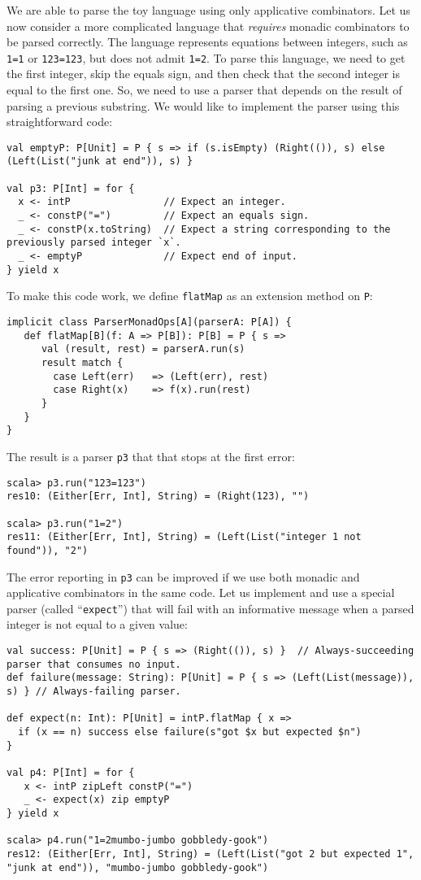 We are able to parse the toy language using only applicative combinators.
Let us now consider a more complicated language that \emph{requires}
monadic combinators to be parsed correctly. The language represents
equations between integers, such as \lstinline!1=1! or \lstinline!123=123!,
but does not admit \lstinline!1=2!. To parse this language, we need
to get the first integer, skip the equals sign, and then check that
the second integer is equal to the first one. So, we need to use a
parser that depends on the result of parsing a previous substring.
We would like to implement the parser using this straightforward code:
\begin{lstlisting}
val emptyP: P[Unit] = P { s => if (s.isEmpty) (Right(()), s) else (Left(List("junk at end")), s) }

val p3: P[Int] = for {
  x <- intP                // Expect an integer.
  _ <- constP("=")         // Expect an equals sign.
  _ <- constP(x.toString)  // Expect a string corresponding to the previously parsed integer `x`.
  _ <- emptyP              // Expect end of input.
} yield x 
\end{lstlisting}
To make this code work, we define \lstinline!flatMap! as an extension
method on \lstinline!P!:
\begin{lstlisting}
implicit class ParserMonadOps[A](parserA: P[A]) {
   def flatMap[B](f: A => P[B]): P[B] = P { s =>
      val (result, rest) = parserA.run(s)
      result match {
        case Left(err)   => (Left(err), rest)
        case Right(x)    => f(x).run(rest)
      }
   }
}
\end{lstlisting}
The result is a parser \lstinline!p3! that that stops at the first
error:
\begin{lstlisting}
scala> p3.run("123=123")
res10: (Either[Err, Int], String) = (Right(123), "")

scala> p3.run("1=2")
res11: (Either[Err, Int], String) = (Left(List("integer 1 not found")), "2")
\end{lstlisting}

The error reporting in \lstinline!p3! can be improved if we use both
monadic and applicative combinators in the same code. Let us implement
and use a special parser (called \textsf{``}\lstinline!expect!\textsf{''}) that will
fail with an informative message when a parsed integer is not equal
to a given value:
\begin{lstlisting}
val success: P[Unit] = P { s => (Right(()), s) }  // Always-succeeding parser that consumes no input.
def failure(message: String): P[Unit] = P { s => (Left(List(message)), s) } // Always-failing parser.

def expect(n: Int): P[Unit] = intP.flatMap { x =>
  if (x == n) success else failure(s"got $x but expected $n")
}

val p4: P[Int] = for {
   x <- intP zipLeft constP("=")
   _ <- expect(x) zip emptyP
} yield x

scala> p4.run("1=2mumbo-jumbo gobbledy-gook")
res12: (Either[Err, Int], String) = (Left(List("got 2 but expected 1", "junk at end")), "mumbo-jumbo gobbledy-gook")
\end{lstlisting}

